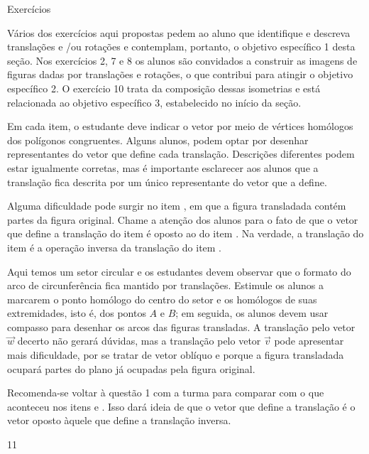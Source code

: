 \clearpage
\def\currentcolor{cor1}
\marginpar{\vspace{-.5em}}
\begin{sugestions}{Exercícios}
{
Vários dos exercícios aqui propostas pedem ao aluno que identifique e descreva translações e /ou rotações e contemplam, portanto, o objetivo específico 1 desta seção. Nos exercícios 2, 7 e 8 os alunos são convidados a construir as imagens de figuras dadas por translações e rotações, o que contribui para atingir o objetivo específico 2. O exercício 10 trata da composição dessas isometrias e está relacionada ao objetivo específico 3, estabelecido no início da seção.   


Em cada item, o estudante deve indicar o vetor por meio de vértices homólogos dos polígonos congruentes. Alguns alunos, podem optar por desenhar representantes do vetor que define cada translação. Descrições diferentes podem estar igualmente corretas, mas é importante esclarecer aos alunos que a translação fica descrita por um único representante do vetor que a define. 

Alguma dificuldade pode surgir no item , em que a figura transladada contém partes da figura original.
Chame a atenção dos alunos para o fato de que o vetor que define a translação do item  é oposto ao do item . Na verdade, a translação do item  é a operação inversa da translação do item . 


Aqui temos um setor circular e os estudantes devem observar que o formato do arco de circunferência fica mantido por translações. Estimule os alunos a marcarem o ponto homólogo do centro do setor e os homólogos de suas extremidades, isto é, dos pontos $A$ e $B$; em seguida, os alunos devem usar compasso para desenhar os arcos das figuras transladas.  A translação pelo vetor $\overrightarrow{w}$  decerto não gerará dúvidas, mas a translação pelo vetor  $\overrightarrow{v}$  pode apresentar mais dificuldade, por se tratar de vetor oblíquo e porque a figura transladada ocupará partes do plano já ocupadas pela figura original.  

Recomenda-se voltar à questão 1 com a turma para comparar com o que aconteceu nos itens  e . Isso dará ideia de que o vetor que define a translação é o vetor oposto àquele que define a translação inversa. 
}{1}{1}
\end{sugestions}
